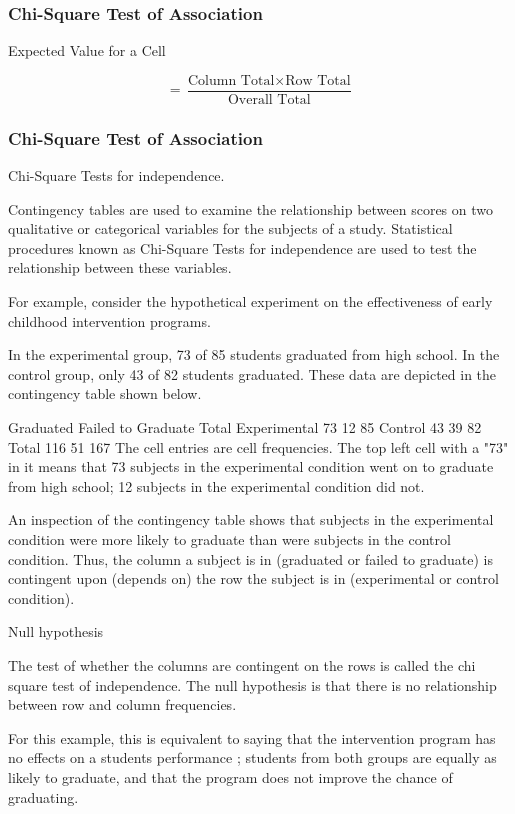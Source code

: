 \begin{frame}
\frametitle{Chi-Square Test of Association}

\Large
Expected Value for a Cell

\[ = \frac{\mbox{Column Total}  \times \mbox{Row Total} } {\mbox{Overall Total}}  \]

\end{frame}

\begin{frame}
\frametitle{Chi-Square Test of Association}

\Large


 
Chi-Square Tests for independence.
 
Contingency tables are used to examine the relationship between scores on two qualitative or categorical variables for the subjects of a study. Statistical procedures known as Chi-Square Tests for independence are used to test the relationship between these variables.
 
For example, consider the hypothetical experiment on the effectiveness of early childhood intervention programs.
 
In the experimental group, 73 of 85 students graduated from high school. In the control group, only 43 of 82 students graduated. These data are depicted in the contingency table shown below. 
 
 
 
Graduated
Failed to
Graduate
Total
Experimental
73
12
85
Control
43
39
82
Total
116
51
167
The cell entries are cell frequencies. The top left cell with a "73" in it means that 73 subjects in the experimental condition went on to graduate from high school; 12 subjects in the experimental condition did not.
 
An inspection of the contingency table shows that subjects in the experimental condition were more likely to graduate than were subjects in the control condition. Thus, the column a subject is in (graduated or failed to graduate) is contingent upon (depends on) the row the subject is in (experimental or control condition). 
 
Null hypothesis
 
The test of whether the columns are contingent on the rows is called the chi square test of independence. The null hypothesis is that there is no relationship between row and column frequencies.
 
For this example, this is equivalent to saying that the intervention program has no effects on a students performance ; students from both groups are equally as likely to graduate, and that the program does not improve the chance of graduating.
 

\end{frame}
